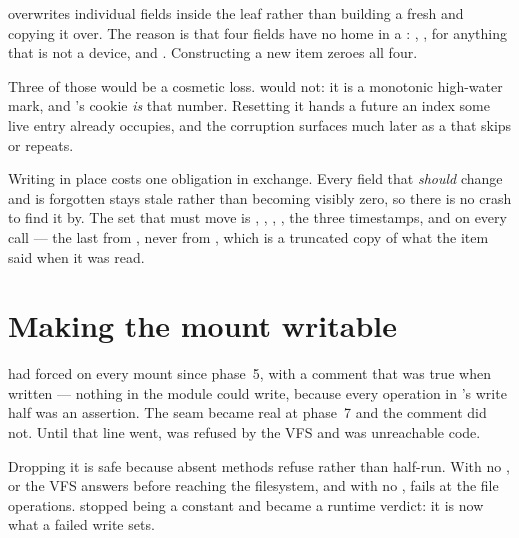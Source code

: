  overwrites individual fields inside the leaf rather than
building a fresh  and copying it over. The reason is
that four fields have no home in a : ,
,  for anything that is not a device, and
. Constructing a new item zeroes all four.

Three of those would be a cosmetic loss.  would not:
it is a monotonic high-water mark, and 's  cookie
\emph{is} that number. Resetting it hands a future  an index some
live entry already occupies, and the corruption surfaces much later as a
 that skips or repeats.

Writing in place costs one obligation in exchange. Every field that \emph{should}
change and is forgotten stays stale rather than becoming visibly zero, so there
is no crash to find it by. The set that must move is , ,
, , the three timestamps, and  on every
call --- the last from , never from
, which is a truncated  copy of what the
item said when it was read.


\section{Making the mount writable}

 had forced  on every mount since phase~5,
with a comment that was true when written --- nothing in the module could write,
because every operation in 's write half was an assertion.
The seam became real at phase~7 and the comment did not. Until that line went,
 was refused by the VFS and  was unreachable code.

Dropping it is safe because absent methods refuse rather than half-run. With no
,  or  the VFS answers
 before reaching the filesystem, and with no ,
 fails at the file operations.  stopped being a
constant and became a runtime verdict: it is now what a failed write sets.

